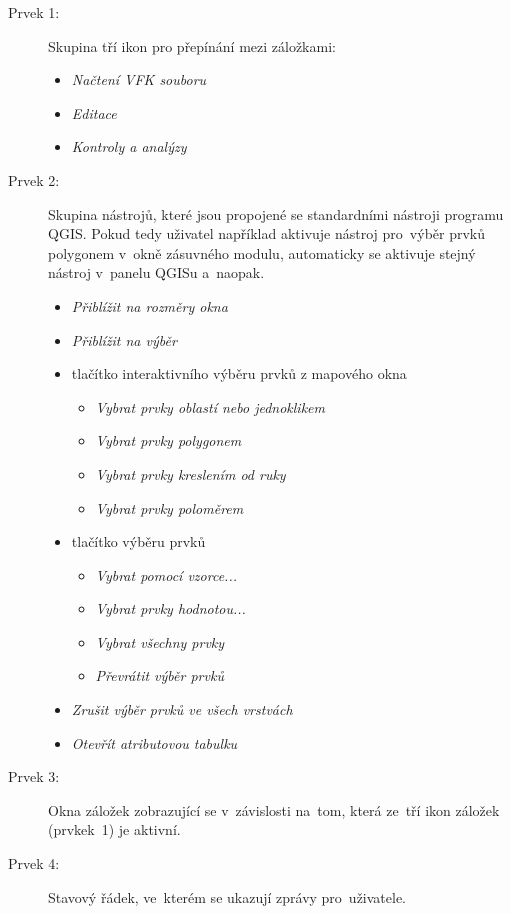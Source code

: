 \begin{description}
	\item[Prvek 1:] Skupina tří ikon pro přepínání mezi záložkami:
	\begin{itemize}[leftmargin=1.5cm, noitemsep]
		\item {} \textit{Načtení VFK souboru}
		\item {} \textit{Editace}
		\item {} \textit{Kontroly a analýzy}
 	\end{itemize}
 	
	\item[Prvek 2:] Skupina nástrojů, které jsou propojené se standardními nástroji programu QGIS. Pokud tedy uživatel například aktivuje nástroj pro~výběr prvků polygonem v~okně zásuvného modulu, automaticky se aktivuje stejný nástroj v~panelu QGISu a~naopak.
	\begin{itemize}[leftmargin=1.5cm, noitemsep]
		\item {} \textit{Přiblížit na rozměry okna}
		\item {} \textit{Přiblížit na výběr}
		\item tlačítko interaktivního výběru prvků z mapového okna
		\begin{itemize}[leftmargin=1.5cm, noitemsep]
			\item {} \textit{Vybrat prvky oblastí nebo jednoklikem}
			\item {} \textit{Vybrat prvky polygonem}
			\item {} \textit{Vybrat prvky kreslením od ruky}
			\item {} \textit{Vybrat prvky poloměrem}
 		\end{itemize}
		\item tlačítko výběru prvků
		\begin{itemize}[leftmargin=1.5cm, noitemsep]
			\item {} \textit{Vybrat pomocí vzorce...}
			\item {} \textit{Vybrat prvky hodnotou...}
			\item {} \textit{Vybrat všechny prvky}
			\item {} \textit{Převrátit výběr prvků}
 		\end{itemize}
		\item {} \textit{Zrušit výběr prvků ve všech vrstvách}
		\item {} \textit{Otevřít atributovou tabulku}
 	\end{itemize}
	\item[Prvek 3:] Okna záložek zobrazující se v~závislosti na~tom, která ze~tří ikon záložek (prvkek~1) je aktivní.
	\item[Prvek 4:] Stavový řádek, ve~kterém se ukazují zprávy pro~uživatele.
\end{description}

